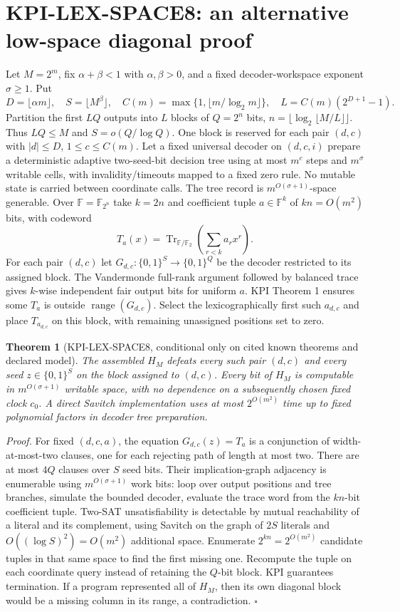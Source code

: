 \documentclass[11pt]{article}
\newtheorem{theorem}{Theorem}
\begin{document}
\section{KPI-LEX-SPACE8: an alternative low-space diagonal proof}
Let $M=2^m$, fix $\alpha+\beta<1$ with $\alpha,\beta>0$, and a fixed decoder-workspace exponent $\sigma\ge1$. Put
\[
D=\lfloor\alpha m\rfloor,\quad S=\lfloor M^\beta\rfloor,\quad
C(m)=\max\{1,\lfloor m/\log_2m\rfloor\},
\quad L=C(m)(2^{D+1}-1).
\]
Partition the first $LQ$ outputs into $L$ blocks of $Q=2^n$ bits, $n=\lfloor\log_2\lfloor M/L\rfloor\rfloor$. Thus $LQ\le M$ and $S=o(Q/\log Q)$. One block is reserved for each pair $(d,c)$ with $|d|\le D$, $1\le c\le C(m)$. Let a fixed universal decoder on $(d,c,i)$ prepare a deterministic adaptive two-seed-bit decision tree using at most $m^c$ steps and $m^\sigma$ writable cells, with invalidity/timeouts mapped to a fixed zero rule. No mutable state is carried between coordinate calls. The tree record is $m^{O(\sigma+1)}$-space generable.
Over $\mathbb F=\mathbb F_{2^n}$ take $k=2n$ and coefficient tuple $a\in\mathbb F^k$ of $kn=O(m^2)$ bits, with codeword
\[
T_a(x)=\operatorname{Tr}_{\mathbb F/\mathbb F_2}\left(\sum_{r<k}a_rx^r\right).
\]
For each pair $(d,c)$ let $G_{d,c}:\{0,1\}^{S}\to\{0,1\}^{Q}$ be the decoder restricted to its assigned block. The Vandermonde full-rank argument followed by balanced trace gives $k$-wise independent fair output bits for uniform $a$. KPI Theorem 1 ensures some $T_a$ is outside $\operatorname{range}(G_{d,c})$. Select the lexicographically first such $a_{d,c}$ and place $T_{a_{d,c}}$ on this block, with remaining unassigned positions set to zero.
\begin{theorem}[KPI-LEX-SPACE8, conditional only on cited known theorems and declared model]
The assembled $H_M$ defeats every such pair $(d,c)$ and every seed $z\in\{0,1\}^S$ on the block assigned to $(d,c)$. Every bit of $H_M$ is computable in $m^{O(\sigma+1)}$ writable space, with no dependence on a subsequently chosen fixed clock $c_0$. A direct Savitch implementation uses at most $2^{O(m^2)}$ time up to fixed polynomial factors in decoder tree preparation.
\end{theorem}
\noindent\emph{Proof.} For fixed $(d,c,a)$, the equation $G_{d,c}(z)=T_a$ is a conjunction of width-at-most-two clauses, one for each rejecting path of length at most two. There are at most $4Q$ clauses over $S$ seed bits. Their implication-graph adjacency is enumerable using $m^{O(\sigma+1)}$ work bits: loop over output positions and tree branches, simulate the bounded decoder, evaluate the trace word from the $kn$-bit coefficient tuple. Two-SAT unsatisfiability is detectable by mutual reachability of a literal and its complement, using Savitch on the graph of $2S$ literals and $O((\log S)^2)=O(m^2)$ additional space. Enumerate $2^{kn}=2^{O(m^2)}$ candidate tuples in that same space to find the first missing one. Recompute the tuple on each coordinate query instead of retaining the $Q$-bit block. KPI guarantees termination. If a program represented all of $H_M$, then its own diagonal block would be a missing column in its range, a contradiction. $\square$
\end{document}
